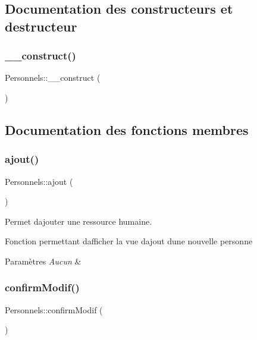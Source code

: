 \subsection{Documentation des constructeurs et destructeur}
\mbox{\label{class_personnels_a4b54507970c94e65af956bc561946f6c}} 
\subsubsection{\texorpdfstring{\+\_\+\+\_\+construct()}{\_\_construct()}}
{\footnotesize\ttfamily Personnels\+::\+\_\+\+\_\+construct (\begin{DoxyParamCaption}{ }\end{DoxyParamCaption})}



\subsection{Documentation des fonctions membres}
\mbox{\label{class_personnels_ab9868ae1b1966f8e9b00ee9431f1a88d}} 
\subsubsection{\texorpdfstring{ajout()}{ajout()}}
{\footnotesize\ttfamily Personnels\+::ajout (\begin{DoxyParamCaption}{ }\end{DoxyParamCaption})}



Permet d\textquotesingle{}ajouter une ressource humaine. 

Fonction permettant d\textquotesingle{}afficher la vue d\textquotesingle{}ajout d\textquotesingle{}une nouvelle personne 
\begin{DoxyParams}{Paramètres}
{\em Aucun} & \\
\hline
\end{DoxyParams}
\mbox{\label{class_personnels_a09d71689c3e7ae5472301c60674a2cf8}} 
\subsubsection{\texorpdfstring{confirm\+Modif()}{confirmModif()}}
{\footnotesize\ttfamily Personnels\+::confirm\+Modif (\begin{DoxyParamCaption}{ }\end{DoxyParamCaption})}



